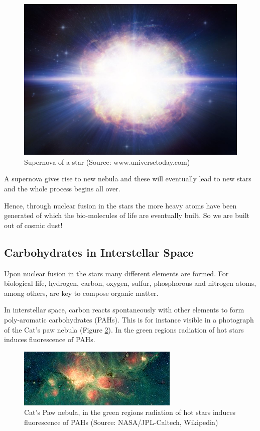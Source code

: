 \documentclass[
  11pt,
]{book}
\begin{document}
\begin{figure}

{\centering \includegraphics[width=0.5\linewidth]{./figs/hires} 

}

\caption{Supernova of a star (Source:  www.universetoday.com)}\label{fig:supernova}
\end{figure}

A supernova gives rise to new nebula and these will eventually lead to new stars and the whole process begins all over.

Hence, through nuclear fusion in the stars the more heavy atoms have been generated of which the bio-molecules of life are eventually built. So we are built out of cosmic dust!

\newpage

\hypertarget{carbohydrates-in-interstellar-space}{%
\subsection{Carbohydrates in Interstellar Space}\label{carbohydrates-in-interstellar-space}}

Upon nuclear fusion in the stars many different elements are formed. For biological life, hydrogen, carbon, oxygen, sulfur, phosphorous and nitrogen atoms, among others, are key to compose organic matter.

In interstellar space, carbon reacts spontaneously with other elements to form poly-aromatic carbohydrates (PAHs). This is for instance visible in a photograph of the Cat's paw nebula (Figure \ref{fig:catPawNebula}). In the green regions radiation of hot stars induces fluorescence of PAHs.

\begin{figure}

{\centering \includegraphics[width=0.5\linewidth]{./figs/orionWithPAH} 

}

\caption{Cat's Paw nebula, in the green regions radiation of hot stars induces fluorescence of PAHs (Source: NASA/JPL-Caltech, Wikipedia)}\label{fig:catPawNebula}
\end{figure}
\end{document}
